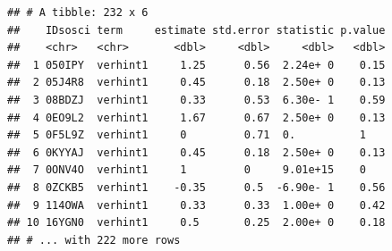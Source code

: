 \documentclass[]{book}
\newenvironment{Shaded}{\begin{snugshade}}{\end{snugshade}}
\newcommand{\CommentTok}[1]{\textcolor[rgb]{0.56,0.35,0.01}{\textit{#1}}}
\newcommand{\DataTypeTok}[1]{\textcolor[rgb]{0.13,0.29,0.53}{#1}}
\newcommand{\DecValTok}[1]{\textcolor[rgb]{0.00,0.00,0.81}{#1}}
\newcommand{\KeywordTok}[1]{\textcolor[rgb]{0.13,0.29,0.53}{\textbf{#1}}}
\newcommand{\NormalTok}[1]{#1}
\newcommand{\OperatorTok}[1]{\textcolor[rgb]{0.81,0.36,0.00}{\textbf{#1}}}
\newcommand{\OtherTok}[1]{\textcolor[rgb]{0.56,0.35,0.01}{#1}}
\newcommand{\StringTok}[1]{\textcolor[rgb]{0.31,0.60,0.02}{#1}}
\begin{document}
\begin{Shaded}
\end{Shaded}

\begin{verbatim}
## # A tibble: 232 x 6
##    IDsosci term     estimate std.error statistic p.value
##    <chr>   <chr>       <dbl>     <dbl>     <dbl>   <dbl>
##  1 050IPY  verhint1     1.25      0.56  2.24e+ 0    0.15
##  2 05J4R8  verhint1     0.45      0.18  2.50e+ 0    0.13
##  3 08BDZJ  verhint1     0.33      0.53  6.30e- 1    0.59
##  4 0EO9L2  verhint1     1.67      0.67  2.50e+ 0    0.13
##  5 0F5L9Z  verhint1     0         0.71  0.          1   
##  6 0KYYAJ  verhint1     0.45      0.18  2.50e+ 0    0.13
##  7 0ONV4O  verhint1     1         0     9.01e+15    0   
##  8 0ZCKB5  verhint1    -0.35      0.5  -6.90e- 1    0.56
##  9 114OWA  verhint1     0.33      0.33  1.00e+ 0    0.42
## 10 16YGN0  verhint1     0.5       0.25  2.00e+ 0    0.18
## # ... with 222 more rows
\end{verbatim}
\end{document}

